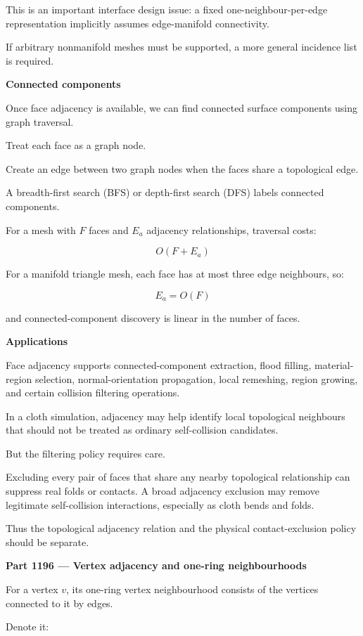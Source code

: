 This is an important interface design issue: a fixed one-neighbour-per-edge representation implicitly assumes edge-manifold connectivity.

If arbitrary nonmanifold meshes must be supported, a more general incidence list is required.

\textbf{Connected components}

Once face adjacency is available, we can find connected surface components using graph traversal.

Treat each face as a graph node.

Create an edge between two graph nodes when the faces share a topological edge.

A breadth-first search (BFS) or depth-first search (DFS) labels connected components.

For a mesh with \(F\) faces and \(E_a\) adjacency relationships, traversal costs:

\[
\boxed{O(F+E_a)}
\]

For a manifold triangle mesh, each face has at most three edge neighbours, so:

\[
E_a=O(F)
\]

and connected-component discovery is linear in the number of faces.

\textbf{Applications}

Face adjacency supports connected-component extraction, flood filling, material-region selection, normal-orientation propagation, local remeshing, region growing, and certain collision filtering operations.

In a cloth simulation, adjacency may help identify local topological neighbours that should not be treated as ordinary self-collision candidates.

But the filtering policy requires care.

Excluding every pair of faces that share any nearby topological relationship can suppress real folds or contacts. A broad adjacency exclusion may remove legitimate self-collision interactions, especially as cloth bends and folds.

Thus the topological adjacency relation and the physical contact-exclusion policy should be separate.

\textbf{Part 1196 --- Vertex adjacency and one-ring neighbourhoods}

For a vertex \(v\), its one-ring vertex neighbourhood consists of the vertices connected to it by edges.

Denote it:

